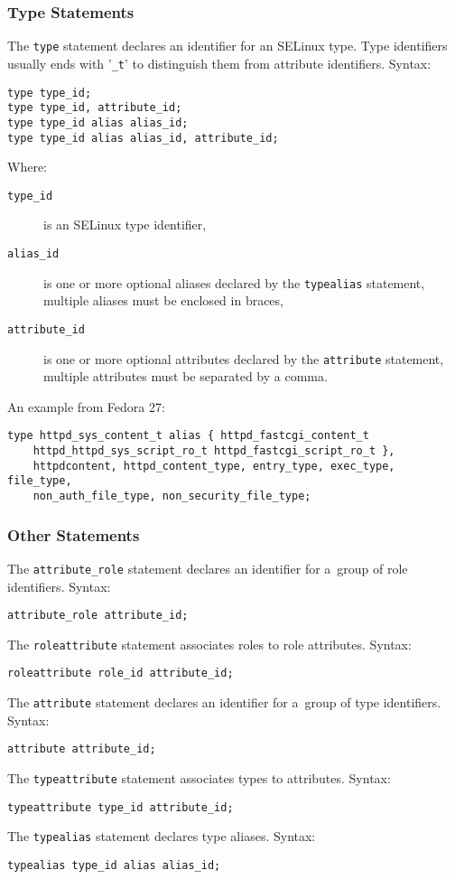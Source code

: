 \subsubsection{Type Statements}
The \texttt{type} statement declares an identifier for an SELinux type. Type
identifiers usually ends with '\texttt{\_t}' to distinguish them from attribute
identifiers. Syntax:
\begin{lstlisting}[language=te]
type type_id;
type type_id, attribute_id;
type type_id alias alias_id;
type type_id alias alias_id, attribute_id;
\end{lstlisting}
Where:
\begin{description}
    \item [\texttt{type\_id}] is an SELinux type identifier,
    \item [\texttt{alias\_id}] is one or more optional aliases declared by the
        \texttt{typealias} statement, multiple aliases must be enclosed in
        braces,
    \item [\texttt{attribute\_id}] is one or more optional attributes declared
        by the \texttt{attribute} statement, multiple attributes must be
        separated by a comma.
\end{description}
An example from Fedora 27:
\begin{lstlisting}[language=te]
type httpd_sys_content_t alias { httpd_fastcgi_content_t
    httpd_httpd_sys_script_ro_t httpd_fastcgi_script_ro_t },
    httpdcontent, httpd_content_type, entry_type, exec_type, file_type,
    non_auth_file_type, non_security_file_type;
\end{lstlisting}

\subsubsection{Other Statements}
The \texttt{attribute\_role} statement declares an identifier for a~group of
role identifiers. Syntax:
\begin{lstlisting}[language=te]
attribute_role attribute_id;
\end{lstlisting}
The \texttt{roleattribute} statement associates roles to role attributes.
Syntax:
\begin{lstlisting}[language=te]
roleattribute role_id attribute_id;
\end{lstlisting}
The \texttt{attribute} statement declares an identifier for a~group of type
identifiers. Syntax:
\begin{lstlisting}[language=te]
attribute attribute_id;
\end{lstlisting}
The \texttt{typeattribute} statement associates types to attributes. Syntax:
\begin{lstlisting}[language=te]
typeattribute type_id attribute_id;
\end{lstlisting}
The \texttt{typealias} statement declares type aliases. Syntax:
\begin{lstlisting}[language=te]
typealias type_id alias alias_id;
\end{lstlisting}

